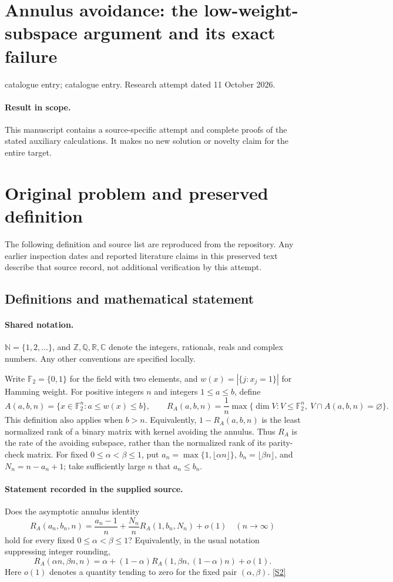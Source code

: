 \documentclass[11pt]{article}
\begin{document}
\section*{Annulus avoidance: the low-weight-subspace argument and its exact failure}
\noindent catalogue entry; catalogue entry. Research attempt dated 11 October 2026.
\paragraph{Result in scope.}This manuscript contains a source-specific attempt and complete proofs of the stated auxiliary calculations. It makes no new solution or novelty claim for the entire target.
\section{Original problem and preserved definition}
The following definition and source list are reproduced from the repository. Any earlier inspection dates and reported literature claims in this preserved text describe that source record, not additional verification by this attempt.
\subsection{Definitions and mathematical statement}

\paragraph{Shared notation.}$\mathbb N=\{1,2,\ldots\}$, and $\mathbb Z,\mathbb Q,\mathbb R,\mathbb C$ denote the integers, rationals, reals and complex numbers. Any other conventions are specified locally.


Write \(\mathbb F_2=\{0,1\}\) for the field with two elements, and \(w(x)=|\{j:x_j=1\}|\) for Hamming weight. For positive integers \(n\) and integers \(1\le a\le b\), define
\[A(a,b,n)=\{x\in\mathbb F_2^n:a\le w(x)\le b\},\qquad
R_A(a,b,n)=\frac1n\max\{\dim V:V\le\mathbb F_2^n,\ V\cap A(a,b,n)=\varnothing\}.\]
This definition also applies when \(b>n\). Equivalently, \(1-R_A(a,b,n)\) is the least normalized rank of a binary matrix with kernel avoiding the annulus. Thus \(R_A\) is the rate of the avoiding subspace, rather than the normalized rank of its parity-check matrix.
For fixed \(0\le\alpha<\beta\le1\), put \(a_n=\max\{1,\lfloor\alpha n\rfloor\}\), \(b_n=\lfloor\beta n\rfloor\), and \(N_n=n-a_n+1\); take sufficiently large \(n\) that \(a_n\le b_n\).
\paragraph{Statement recorded in the supplied source.}
Does the asymptotic annulus identity
\[R_A(a_n,b_n,n)=\frac{a_n-1}{n}+\frac{N_n}{n}R_A(1,b_n,N_n)+o(1)\quad(n\to\infty)\]
hold for every fixed \(0\le\alpha<\beta\le1\)? Equivalently, in the usual notation suppressing integer rounding,
\[R_A(\alpha n,\beta n,n)=\alpha+(1-\alpha)R_A(1,\beta n,(1-\alpha)n)+o(1).\]
Here \(o(1)\) denotes a quantity tending to zero for the fixed pair \((\alpha,\beta)\). \href{https://arxiv.org/pdf/1401.6528}{[S2]}
\end{document}
